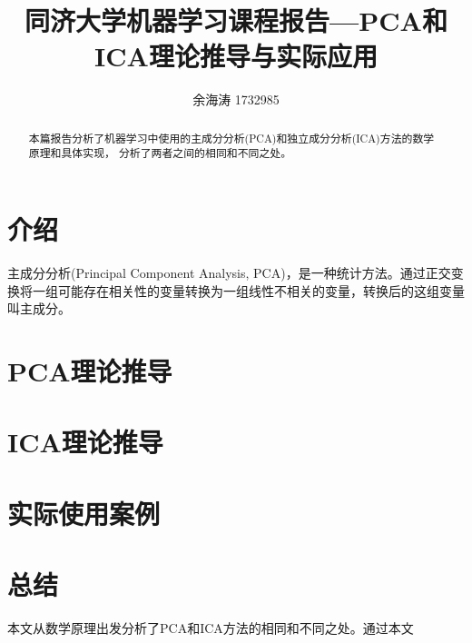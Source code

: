 \documentclass[UTF8]{ctexart}
\title{同济大学机器学习课程报告---PCA和ICA理论推导与实际应用}
\author{余海涛 1732985}
\begin{document}
\maketitle

\begin{abstract}
    本篇报告分析了机器学习中使用的主成分分析(PCA)和独立成分分析(ICA)方法的数学原理和具体实现，
    分析了两者之间的相同和不同之处。
\end{abstract}


\section{介绍}
主成分分析(Principal Component Analysis, PCA)，\cite{pca}是一种统计方法。通过正交变换将一组可能存在相关性的变量转换为一组线性不相关的变量，转换后的这组变量叫主成分。

\section{PCA理论推导}

\section{ICA理论推导}

\section{实际使用案例}

\section{总结}
本文从数学原理出发分析了PCA和ICA方法的相同和不同之处。通过本文


\end{document}
